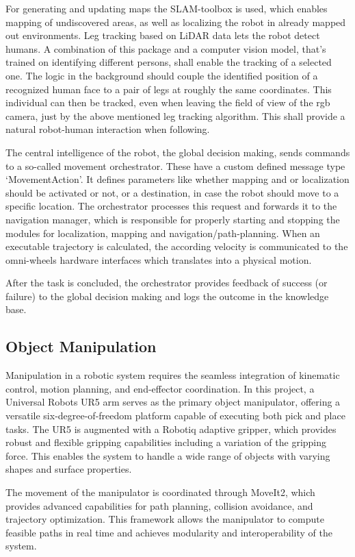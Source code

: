 For generating and updating maps the SLAM-toolbox is used, which enables mapping of undiscovered areas, as well as localizing the robot in already mapped out environments. Leg tracking based on LiDAR data \cite{Rastogi2021} lets the robot detect humans. A combination of this package and a computer vision model, that's trained on identifying different persons, shall enable the tracking of a selected one. The logic in the background should couple the identified position of a recognized human face to a pair of legs at roughly the same coordinates. This individual can then be tracked, even when leaving the field of view of the rgb camera, just by the above mentioned leg tracking algorithm. This shall provide a natural robot-human interaction when following.

The central intelligence of the robot, the global decision making, sends commands to a so-called movement orchestrator. These have a custom defined message type ‘MovementAction'. It defines parameters like whether mapping and or localization should be activated or not, or a destination, in case the robot should move to a specific location. The orchestrator processes this request and forwards it to the navigation manager, which is responsible for properly starting and stopping the modules for localization, mapping and navigation/path-planning. When an executable trajectory is calculated, the according velocity is communicated to the omni-wheels hardware interfaces which translates into a physical motion.

After the task is concluded, the orchestrator provides feedback of success (or failure) to the global decision making and logs the outcome in the knowledge base.

\subsection{Object Manipulation}
Manipulation in a robotic system requires the seamless integration of kinematic control, motion planning, and end-effector coordination. In this project, a Universal Robots UR5 arm serves as the primary object manipulator, offering a versatile six-degree-of-freedom platform capable of executing both pick and place tasks. The UR5 is augmented with a Robotiq adaptive gripper, which provides robust and flexible gripping capabilities including a variation of the gripping force. This enables the system to handle a wide range of objects with varying shapes and surface properties.

The movement of the manipulator is coordinated through MoveIt2, which provides advanced capabilities for path planning, collision avoidance, and trajectory optimization. This framework allows the manipulator to compute feasible paths in real time and achieves modularity and interoperability of the system.

